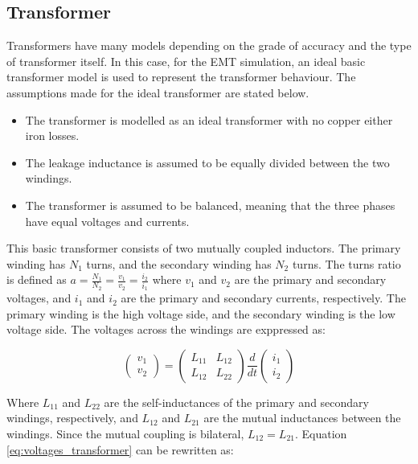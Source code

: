 \subsection{Transformer}

Transformers have many models depending on the grade of accuracy and the type of transformer itself. In this case, for the EMT 
simulation, an ideal basic transformer model is used to represent the transformer behaviour. The assumptions made for the ideal transformer are stated below.
\begin{itemize}
    \item The transformer is modelled as an ideal transformer with no copper either iron losses.
    \item The leakage inductance is assumed to be equally divided between the two windings. 
    \item The transformer is assumed to be balanced, meaning that the three phases have equal voltages and currents.
\end{itemize}

This basic transformer consists of two mutually coupled inductors. The primary winding has $N_1$ turns, and the secondary winding has $N_2$ turns. 
The turns ratio is defined as $a = \frac{N_1}{N_2} = \frac{v_1}{v_2} = \frac{i_2}{i_1} $ where $v_1$ and $v_2$ are the primary and secondary voltages, 
and $i_1$ and $i_2$ are the primary and secondary currents, respectively. The primary winding is the high voltage side, and the secondary winding is 
the low voltage side. The voltages across the windings are exppressed as:

\begin{equation}
\begin{pmatrix}
v_1 \\
v_2
\end{pmatrix}
=
\begin{pmatrix}
L_{11} & L_{12} \\
L_{12} & L_{22}
\end{pmatrix}
\frac{d}{dt}
\begin{pmatrix}
i_1 \\
i_2
\end{pmatrix}
\label{eq:voltages_transformer_1}
\end{equation}

Where $L_{11}$ and $L_{22}$ are the self-inductances of the primary and secondary windings, respectively, and $L_{12}$ and $L_{21}$ are the 
mutual inductances between the windings. Since the mutual coupling is bilateral, $L_{12} = L_{21}$. Equation \eqref{eq:voltages_transformer} can be rewritten as:

